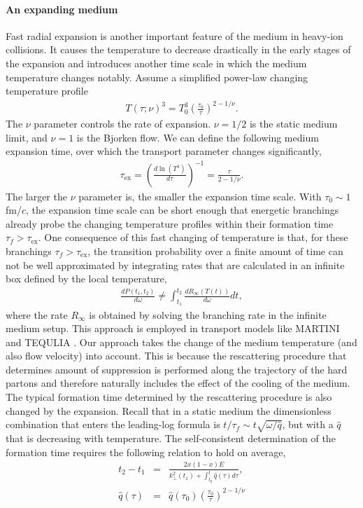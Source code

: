\paragraph{An expanding medium}
Fast radial expansion is another important feature of the medium in heavy-ion collisions.
It causes the temperature to decrease drastically in the early stages of the expansion and introduces another time scale in which the medium temperature changes notably.
Assume a simplified power-law changing temperature profile
\begin{eqnarray}
T(\tau; \nu)^3 = T_0^3\left(\frac{\tau_0}{\tau}\right)^{2-1/\nu}.
\end{eqnarray}
The $\nu$ parameter controls the rate of expansion. 
$\nu = 1/2$ is the static medium limit, and $\nu=1$ is the Bjorken flow.
We can define the following medium expansion time, over which the transport parameter changes significantly,
\begin{eqnarray}
\tau_{\textrm{ex}} = \left(\frac{d\ln(T^3)}{d \tau} \right)^{-1} = \frac{\tau}{2-1/\nu}.
\end{eqnarray}
The larger the $\nu$ parameter is, the smaller the expansion time scale.
With $\tau_0 \sim 1$ fm/$c$, the expansion time scale can be short enough that energetic branchings already probe the changing temperature profiles within their formation time $\tau_f > \tau_{\textrm{ex}}$.
One consequence of this fast changing of temperature is that, for these branchings $\tau_f > \tau_{\textrm{ex}}$, the transition probability over a finite amount of time can not be well approximated by integrating rates that are calculated in an infinite box defined by the local temperature,
\begin{eqnarray}
\frac{dP(t_1, t_2)}{d\omega} \neq \int_{t_1}^{t_2} \frac{dR_{\infty}(T(t))}{d\omega} dt,
\end{eqnarray}
where the rate $R_\infty$ is obtained by solving the branching rate in the infinite medium setup. 
This approach is employed in transport models like MARTINI and TEQULIA \cite{Jeon:2003gi,Schenke:2009gb,Dai:2019hbi}.
Our approach takes the change of the medium temperature (and also flow velocity) into account.
This is because the rescattering procedure that determines amount of suppression is performed along the trajectory of the hard partons and therefore naturally includes the effect of the cooling of the medium.
The typical formation time determined by the rescattering procedure is also changed by the expansion.
Recall that in a static medium the dimensionless combination that enters the leading-log formula is $t/\tau_f \sim t \sqrt{\omega/\hat{q}}$, but with a $\hat{q}$ that is decreasing with temperature.
The self-consistent determination of the formation time requires the following relation to hold on average,
\begin{eqnarray}
t_2 - t_1 &=& \frac{2x(1-x)E}{k_{\perp}^2(t_1) + \int_{t_0}^{t} \hat{q}(\tau) d\tau},\\
\hat{q}(\tau) &=& \hat{q}(\tau_0) \left(\frac{\tau_0}{\tau}\right)^{2-1/\nu}
\end{eqnarray}

